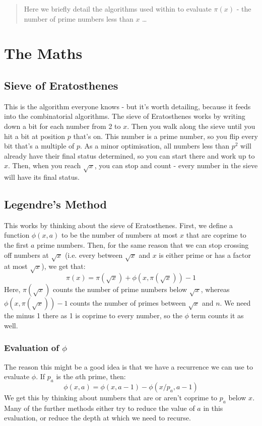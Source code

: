 \documentclass[12pt]{article}
\begin{document}
\maketitle

\begin{abstract}
Here we briefly detail the algorithms used within to evaluate $\pi(x)$ - the number of prime numbers less than $x$ \ldots
\end{abstract}

\section{The Maths}
\subsection{Sieve of Eratosthenes}
This is the algorithm everyone knows - but it's worth detailing, because it feeds into the combinatorial algorithms.
The sieve of Eratosthenes works by writing down a bit for each number from 2 to $x$. Then you walk along the sieve
until you hit a bit at position $p$ that's on. This number is a prime number, so you flip every bit that's a multiple
of $p$. As a minor optimisation, all numbers less than $p^2$ will already have their final status determined, so you
can start there and work up to $x$. Then, when you reach $\sqrt{x}$, you can stop and count - every number in the sieve
will have its final status.

\subsection{Legendre's Method}
This works by thinking about the sieve of Eratosthenes. First, we define a function $\phi(x,a)$ to be the number of
numbers at most $x$ that are coprime to the first $a$ prime numbers. Then, for the same reason that we can stop
crossing off numbers at $\sqrt{x}$ (i.e. every between $\sqrt{x}$ and $x$ is either prime or has a factor at
most $\sqrt{x}$), we get that:
$$\pi(x) = \pi\left(\sqrt{x}\right) + \phi\left(x, \pi\left(\sqrt{x}\right)\right) - 1$$
Here, $\pi\left(\sqrt{x}\right)$ counts the number of prime numbers below $\sqrt{x}$, whereas 
$\phi\left(x, \pi\left(\sqrt{x}\right)\right) - 1$ counts the number of primes between $\sqrt{x}$ and $n$. We need the
minus 1 there as 1 is coprime to every number, so the $\phi$ term counts it as well.

\subsubsection{Evaluation of $\phi$}
The reason this might be a good idea is that we have a recurrence we can use to evaluate $\phi$. If $p_a$ is the
$a$th prime, then:
$$\phi(x,a) = \phi(x, a-1) - \phi(x/p_a, a-1)$$
We get this by thinking about numbers that are or aren't coprime to $p_a$ below $x$. Many of the further methods
either try to reduce the value of $a$ in this evaluation, or reduce the depth at which we need to recurse.
\end{document}

